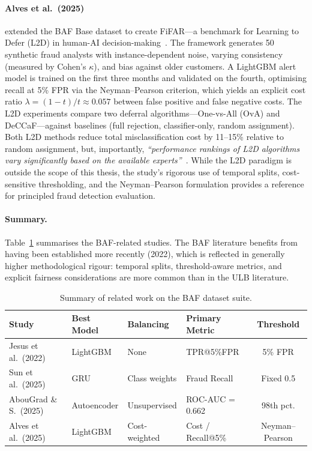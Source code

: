 \paragraph{Alves et al.\ (2025)}
extended the BAF Base dataset to create FiFAR---a benchmark for Learning to Defer (L2D) in human-AI decision-making~\cite{alves2025benchmarking}. The framework generates 50 synthetic fraud analysts with instance-dependent noise, varying consistency (measured by Cohen's $\kappa$), and bias against older customers. A LightGBM alert model is trained on the first three months and validated on the fourth, optimising recall at 5\% FPR via the Neyman--Pearson criterion, which yields an explicit cost ratio $\lambda = (1-t)/t \approx 0.057$ between false positive and false negative costs. The L2D experiments compare two deferral algorithms---One-vs-All (OvA) and DeCCaF---against baselines (full rejection, classifier-only, random assignment). Both L2D methods reduce total misclassification cost by 11--15\% relative to random assignment, but, importantly, \emph{``performance rankings of L2D algorithms vary significantly based on the available experts''}~\cite{alves2025benchmarking}. While the L2D paradigm is outside the scope of this thesis, the study's rigorous use of temporal splits, cost-sensitive thresholding, and the Neyman--Pearson formulation provides a reference for principled fraud detection evaluation.

\paragraph{Summary.}
Table~\ref{tab:rw_baf_summary} summarises the BAF-related studies. The BAF literature benefits from having been established more recently (2022), which is reflected in generally higher methodological rigour: temporal splits, threshold-aware metrics, and explicit fairness considerations are more common than in the ULB literature.

\begin{table}[H]
\centering
\caption{Summary of related work on the BAF dataset suite.}
\label{tab:rw_baf_summary}
\small
\begin{tabular}{l l l l c}
\toprule
Study & Best Model & Balancing & Primary Metric & Threshold \\
\midrule
Jesus et al.\ (2022)  & LightGBM    & None          & TPR@5\%FPR        & 5\% FPR  \\
Sun et al.\ (2025)    & GRU         & Class weights & Fraud Recall      & Fixed 0.5 \\
AbouGrad \& S.\ (2025) & Autoencoder & Unsupervised  & ROC-AUC = 0.662   & 98th pct. \\
Alves et al.\ (2025)  & LightGBM    & Cost-weighted & Cost / Recall@5\% & Neyman--Pearson \\
\bottomrule
\end{tabular}
\end{table}



